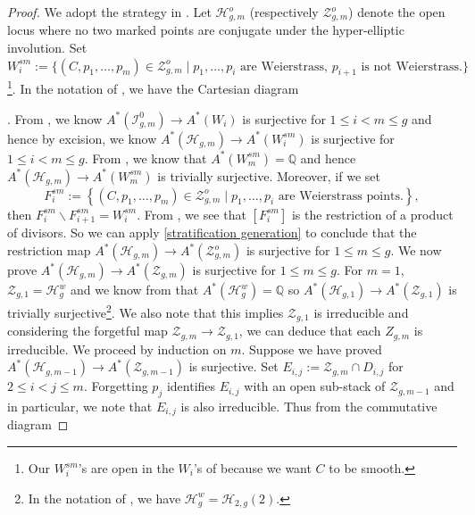 \documentclass[11pt]{amsart}
\theoremstyle{definition}
\newcommand{\ri}{\rightarrow}
\begin{document}
\begin{proof}
    We adopt the strategy in \cite{cl-hyp}. Let $\mathcal H^o_{g,m}$ (respectively $\mathcal Z^o_{g,m}$) denote the open locus where no two marked points are conjugate under the hyper-elliptic involution. Set $W_i^{sm}:= \big \{(C, p_1,\dots, p_m) \in \mathcal Z^o_{g,m} \mid p_1,\dots, p_i \text{ are Weierstrass, }p_{i+1}\text{ is not Weierstrass.}   \big \}$ \footnote{Our $W_i^{sm}$'s are open in the $W_i$'s of \cite{cl-hyp} because we want $C$ to be smooth.}. In the notation of \cite{cl-hyp}, we have the Cartesian diagram .  From \cite[Lemma 4.6]{cl-hyp}, we know $A^* (\mathcal I^0_{g,m}) \rightarrow A^* (W_i)$ is surjective for $1\leq i<m \leq g$ and hence by excision, we know $A^* (\mathcal H_{g,m}) \rightarrow A^* (W^{sm}_i)$ is surjective for $1\leq i<m\leq g$. From \cite[Lemma 3.8]{cl-hyp}, we know that $A^* (W^{sm}_m) =\mathbb Q$ and hence $A^*(\mathcal H_{g,m}) \ri A^*(W^{sm}_m)$ is trivially surjective. Moreover, if we set $$F^{sm}_i:= \left \{ (C,p_1,\dots, p_m) \in \mathcal Z^o_{g,m} \mid p_1,\dots, p_i\text{ are Weierstrass points.} \right \}, $$
then $F^{sm}_i \backslash F^{sm}_{i+1} = W^{sm}_i$. From \cite[Lemma 2.9]{cl-hyp}, we see that $[F^{sm}_i]$ is the restriction of a product of divisors. So we can apply \ref{stratification generation} to conclude that the restriction map $A^* (\mathcal H_{g,m}) \rightarrow A^* (\mathcal Z^o_{g,m})$ is surjective for $1\leq m\leq g$.  We now prove $A^* (\mathcal H_{g,m}) \rightarrow A^* (\mathcal Z_{g,m})$ is surjective for $1\leq m \leq g$. For $m=1$, $\mathcal Z_{g,1} =\mathcal H^w_g$ and we know from \cite[Lemma 4.1]{clader2025chowringshurwitzspaces} that $A^* (\mathcal H_g^w) =\mathbb Q$ so $A^* (\mathcal H_{g,1}) \rightarrow A^* (\mathcal Z_{g,1})$ is trivially surjective\footnote{In the notation of \cite{clader2025chowringshurwitzspaces}, we have $\mathcal H^w_g =\mathcal H_{2,g}(2)$.}. We also note that this implies $\mathcal Z_{g,1}$ is irreducible and considering the forgetful map $\mathcal Z_{g,m} \rightarrow \mathcal Z_{g,1}$, we can deduce that each $Z_{g,m}$ is irreducible. We proceed by induction on $m$. Suppose we have proved $A^* (\mathcal H_{g,m-1}) \rightarrow A^* (\mathcal Z_{g,m-1})$ is surjective. Set $E_{i,j}:=\mathcal Z_{g,m}\cap D_{i,j}$ for $2\leq i< j\leq m$. Forgetting $p_j$ identifies $E_{i,j}$ with an open sub-stack of $\mathcal Z_{g,m-1}$ and in particular, we note that $E_{i,j}$ is also irreducible. Thus from the commutative diagram \begin{tikzcd}

\end{tikzcd}
\end{proof}
\end{document}
